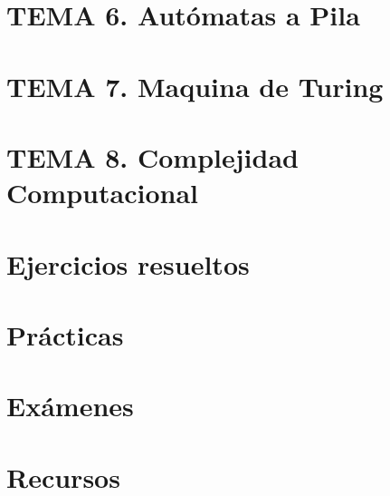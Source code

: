 \documentclass[12pt, twoside, openright]{report} %
\begin{document}
\part{TEMA 6. Autómatas a Pila}




\part{TEMA 7. Maquina de Turing}




\part{TEMA 8. Complejidad Computacional}


\part{Ejercicios resueltos}




\part{Prácticas}










\part{Exámenes}













\part{Recursos}

\end{document}
